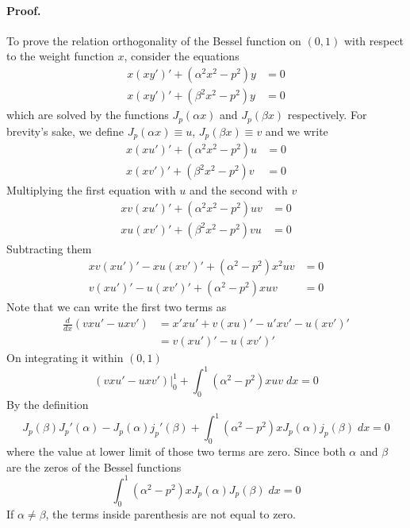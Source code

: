 \documentclass[../main.tex]{subfiles}
\begin{document}
\paragraph*{Proof.} To prove the relation orthogonality of the Bessel function on $(0,1)$ with respect to the weight function $x$, consider the equations
\begin{align*}
    x(xy')'+(\alpha^2x^2-p^2)y & =0 \\
    x(xy')'+(\beta^2x^2-p^2)y  & =0
\end{align*}
which are solved by the functions $J_p(\alpha x)$ and $J_p(\beta x)$ respectively.
For brevity's sake, we define $J_p(\alpha x)\equiv u$,  $J_p(\beta x)\equiv v$ and we write
\begin{align*}
    x(xu')'+(\alpha^2x^2-p^2)u & =0 \\
    x(xv')'+(\beta^2x^2-p^2)v  & =0
\end{align*}
Multiplying the first equation with $u$ and the second with $v$
\begin{align*}
    xv(xu')'+(\alpha^2x^2-p^2)uv & =0 \\
    xu(xv')'+(\beta^2x^2-p^2)vu  & =0
\end{align*}
Subtracting them
\begin{align*}
    xv(xu')'-xu(xv')'+(\alpha^2-p^2)x^2uv & =0 \\
    v(xu')'-u(xv')'+(\alpha^2-p^2)xuv     & =0
\end{align*}
Note that we can write the first two terms as
\begin{align*}
    \frac{d}{dx}\left(vxu'-uxv'\right) & =x'xu'+v(xu)'-u'xv'-u(xv')' \\
                                       & =v(xu')'-u(xv')'
\end{align*}
On integrating it within $(0,1)$
\begin{equation*}
    \left(vxu'-uxv'\right)\bigg|_0^1+\int_{0}^{1}(\alpha^2-p^2)xuv\;dx=0
\end{equation*}
By the definition
\begin{equation*}
    J_p(\beta)J_p'(\alpha) -J_p(\alpha)j_p'(\beta) +\int_{0}^{1}(\alpha^2-p^2)xJ_p(\alpha)j_p(\beta)\;dx=0
\end{equation*}
where the value at lower limit of those two terms are zero.
Since both $\alpha$ and $\beta$ are the zeros of the Bessel functions
\begin{equation*}
    \int_{0}^{1}(\alpha^2-p^2)xJ_p(\alpha)J_p(\beta)\;dx=0
\end{equation*}
If $\alpha\neq\beta$, the terms inside parenthesis are not equal to zero.
\end{document}
